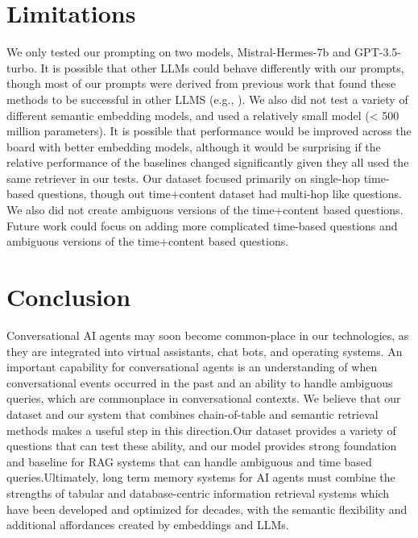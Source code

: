 \documentclass{article}
\begin{document}
\section{Limitations}
\vspace{-0.3cm}We only tested our prompting on two models, Mistral-Hermes-7b and GPT-3.5-turbo. It is possible that other LLMs could behave differently with our prompts, though most of our prompts were derived from previous work that found these methods to be successful in other LLMS (e.g., \cite{wang2024chain}). We also did not test a variety of different semantic embedding models, and used a relatively small model (< 500 million parameters). It is possible that performance would be improved across the board with better embedding models, although it would be surprising if the relative performance of the baselines changed significantly given they all used the same retriever in our tests. Our dataset focused primarily on single-hop time-based questions, though out time+content dataset had multi-hop like questions. We also did not create ambiguous versions of the time+content based questions. Future work could focus on adding more complicated time-based questions and ambiguous versions of the time+content based questions. 
\vspace{-0.3cm}
\section{Conclusion}
\vspace{-0.3cm}Conversational AI agents may soon become common-place in our technologies, as they are integrated into virtual assistants, chat bots, and operating systems. An important capability for conversational agents is an understanding of when conversational events occurred in the past and an ability to handle ambiguous queries, which are commonplace in conversational contexts. We believe that our dataset and our system that combines chain-of-table and semantic retrieval methods makes a useful step in this direction.Our dataset provides a variety of questions that can test these ability, and our model provides strong foundation and baseline for RAG systems that can handle ambiguous and time based queries.Ultimately, long term memory systems for AI agents must combine the strengths of tabular and database-centric information retrieval systems which have been developed and optimized for decades, with the semantic flexibility and additional affordances created by embeddings and LLMs.




\end{document}
